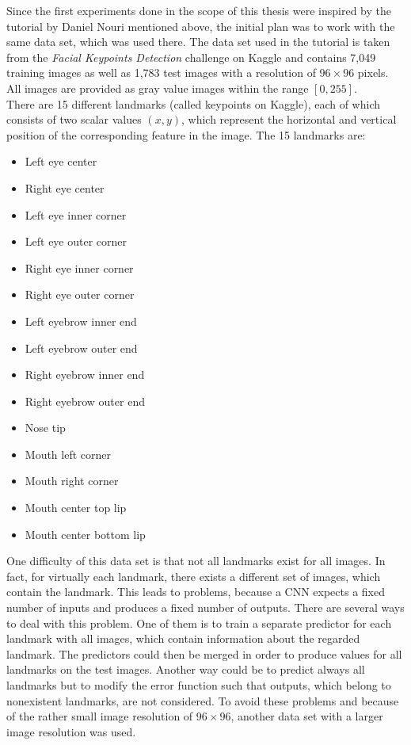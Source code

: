 \documentclass[11pt, a4paper]{article}
\begin{document}
Since the first experiments done in the scope of this thesis were inspired by the tutorial by Daniel Nouri mentioned above, the initial plan was to work with the same data set, which was used there. The data set used in the tutorial is taken from the \emph{Facial Keypoints Detection} challenge on Kaggle and contains 7,049 training images as well as 1,783 test images with a resolution of $96 \times 96$ pixels. All images are provided as gray value images within the range $[0,255]$.\\
There are 15 different landmarks (called keypoints on Kaggle), each of which consists of two scalar values $(x,y)$, which represent the horizontal and vertical position of the corresponding feature in the image. The 15 landmarks are:
\vspace{-0.2cm}
\begin{multicols}{2}
	\begin{itemize}[itemsep=-2ex]
		\item Left eye center
		\item Right eye center
		\item Left eye inner corner
		\item Left eye outer corner
		\item Right eye inner corner
		\item Right eye outer corner
		\item Left eyebrow inner end
		\item Left eyebrow outer end
	\end{itemize}
\columnbreak
	\begin{itemize}[itemsep=-2ex]
		\item Right eyebrow inner end
		\item Right eyebrow outer end
		\item Nose tip
		\item Mouth left corner
		\item Mouth right corner
		\item Mouth center top lip
		\item Mouth center bottom lip
	\end{itemize}
	\vphantom{}
\end{multicols}
\vspace{-0.5cm}
One difficulty of this data set is that not all landmarks exist for all images. In fact, for virtually each landmark, there exists a different set of images, which contain the landmark. This leads to problems, because a \ac{CNN} expects a fixed number of inputs and produces a fixed number of outputs. There are several ways to deal with this problem. One of them is to train a separate predictor for each landmark with all images, which contain information about the regarded landmark. The predictors could then be merged in order to produce values for all landmarks on the test images. Another way could be to predict always all landmarks but to modify the error function such that outputs, which belong to nonexistent landmarks, are not considered. To avoid these problems and because of the rather small image resolution of $96 \times 96$, another data set with a larger image resolution was used.
\end{document}
